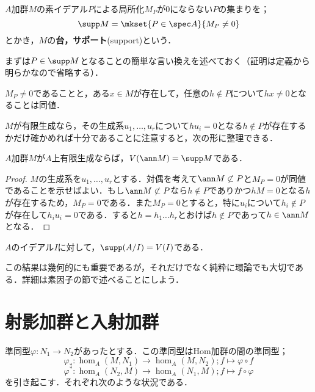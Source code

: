 \begin{defi}[台，サポート]\label{defi:support}
	$A$加群$M$の素イデアル$P$による局所化$M_P$が0にならない$P$の集まりを；
	\[\supp M=\mkset{ P\in\spec A}{M_ P\neq 0}\]
	とかき，$M$の\textbf{台，サポート}(support)という．
\end{defi}

まずは$P\in\supp M$となることの簡単な言い換えを述べておく（証明は定義から明らかなので省略する）．

\begin{lem}\label{lem:M_p=0との同値条件}
	$M_P\neq0$であることと，ある$x\in M$が存在して，任意の$h\not\in P$について$hx\neq 0$となることは同値．
\end{lem}

$M$が有限生成なら，その生成系$u_1,\dots,u_r$について$hu_i=0$となる$h\not\in P$が存在するかだけ確かめれば十分であることに注意すると，次の形に整理できる．

\begin{prop}\label{prop:Zariskiの閉集合とsupp}
	$A$加群$M$が$A$上有限生成ならば，$V(\ann M)=\supp M$である．
\end{prop}

\begin{proof}
	$M$の生成系を$u_1,\dots,u_r$とする．対偶を考えて$\ann M\not\subset P$と$M_P=0$が同値であることを示せばよい．もし$\ann M\not\subset P$なら$h\not\in P$でありかつ$hM=0$となる$h$が存在するため，$M_P=0$である．また$M_P=0$とすると，特に$u_i$について$h_i\not\in P$が存在して$h_iu_i=0$である．すると$h=h_1\dots h_r$とおけば$h\not\in P$であって$h\in\ann M$となる．
\end{proof}

\begin{cor}\label{cor:supp A/I}
	$A$のイデアル$I$に対して，$\supp (A/I)=V(I)$である．
\end{cor}

この結果は幾何的にも重要であるが，それだけでなく純粋に環論でも大切である．詳細は素因子の節で述べることにしよう．

\section{射影加群と入射加群}

準同型$\varphi:N_1\to N_2$があったとする．この準同型はHom加群の間の準同型；
\[\varphi_\ast :\hom_A(M,N_1)\to\hom_A(M,N_2);f\mapsto \varphi\circ f\]
\[\varphi^\ast :\hom_A(N_2,M)\to\hom_A(N_1,M);f\mapsto f\circ \varphi\]
を引き起こす．それぞれ次のような状況である．

